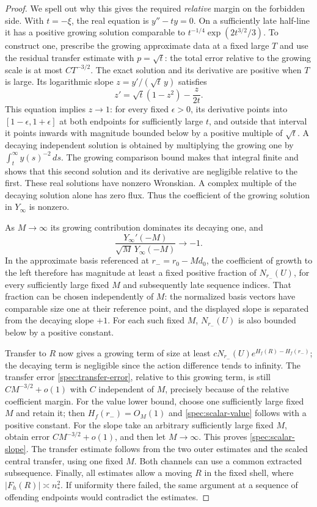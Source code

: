 \documentclass[11pt]{article}
\numberwithin{equation}{section}
\theoremstyle{definition}
\theoremstyle{remark}
\begin{document}
\begin{proof}
We spell out why this gives the required \emph{relative} margin on
the forbidden side. With $t=-\xi$, the real equation is $y''-ty=0$.
On a sufficiently late half-line it has a positive growing solution
comparable to $t^{-1/4}\exp(2t^{3/2}/3)$. To construct one, prescribe
the growing approximate data at a fixed large $T$ and use the residual
transfer estimate with $p=\sqrt t$: the total error relative to the
growing scale is at most $CT^{-3/2}$. The exact solution and its
derivative are positive when $T$ is large. Its logarithmic slope
$z=y'/(\sqrt t\,y)$ satisfies
\[
 z'=\sqrt t(1-z^2)-\frac{z}{2t}.
\]
This equation implies $z\to1$: for every fixed $\epsilon>0$, its
derivative points into $[1-\epsilon,1+\epsilon]$ at both endpoints
for sufficiently large $t$, and outside that interval it points
inwards with magnitude bounded below by a positive multiple of
$\sqrt t$. A decaying independent solution is obtained by multiplying
the growing one by $\int_t^\infty y(s)^{-2}\,ds$. The growing
comparison bound makes that integral finite and shows that this
second solution and its derivative are negligible relative to the
first. These real solutions have nonzero Wronskian. A complex multiple
of the decaying solution alone has zero flux. Thus the coefficient of
the growing solution in $Y_\infty$ is nonzero.

As $M\to\infty$ its growing contribution dominates its decaying one,
and
\[
 \frac{Y_\infty'(-M)}{\sqrt M\,Y_\infty(-M)}\longrightarrow-1.
\]
In the approximate basis referenced at $r_-=r_0-Md_0$, the coefficient
of growth to the left therefore has magnitude at least a fixed
positive fraction of $N_{r_-}(U)$, for every sufficiently large fixed
$M$ and subsequently late sequence indices. That fraction can be
chosen independently of $M$: the normalized basis vectors have
comparable size one at their reference point, and the displayed
slope is separated from the decaying slope $+1$. For each such fixed
$M$, $N_{r_-}(U)$ is also bounded below by a positive constant.

Transfer to $R$ now gives a growing term of size at least
$cN_{r_-}(U)e^{H_f(R)-H_f(r_-)}$; the decaying term is negligible since
the action difference tends to infinity. The transfer error
\eqref{spec:transfer-error}, relative to this growing term, is still
$CM^{-3/2}+o(1)$ with $C$ independent of $M$, precisely because of the
relative coefficient margin. For the value lower bound, choose one
sufficiently large fixed $M$ and retain it; then $H_f(r_-)=O_M(1)$
and \eqref{spec:scalar-value} follows with a positive constant.
For the slope take an arbitrary sufficiently large fixed $M$, obtain
error $CM^{-3/2}+o(1)$, and then let $M\to\infty$. This proves
\eqref{spec:scalar-slope}. The transfer estimate follows from the two
outer estimates and the scaled central transfer, using one fixed
$M$. Both channels can use a common extracted subsequence. Finally,
all estimates allow a moving $R$ in the fixed shell, where
$|F_h(R)|\asymp n_*^2$. If uniformity there failed, the same argument
at a sequence of offending endpoints would contradict the estimates.
\end{proof}
\end{document}

